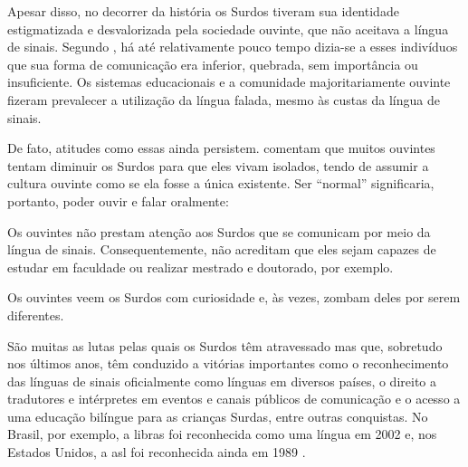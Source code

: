 

Apesar disso, no decorrer da história os Surdos tiveram sua identidade estigmatizada e desvalorizada pela sociedade ouvinte, que não aceitava a língua de sinais. Segundo , há até relativamente pouco tempo dizia-se a esses indivíduos que sua forma de comunicação era inferior, quebrada, sem importância ou insuficiente. Os sistemas educacionais e a comunidade majoritariamente ouvinte fizeram prevalecer a utilização da língua falada, mesmo às custas da língua de sinais.

De fato, atitudes como essas ainda persistem.  comentam que muitos ouvintes tentam  diminuir os Surdos para que eles vivam isolados, tendo de assumir a cultura ouvinte como se ela fosse a única existente. Ser ``normal'' significaria, portanto, poder ouvir e falar oralmente:


\begin{citacao}
    Os ouvintes não prestam atenção aos Surdos que se comunicam por meio da língua de sinais. Consequentemente, não acreditam que eles sejam capazes de estudar em faculdade ou realizar mestrado e  doutorado, por exemplo. \cite{pereira-2011-conhecimento-alem-sinais}
\end{citacao}

\begin{citacao}
    Os ouvintes veem os Surdos com curiosidade e, às vezes, zombam deles por serem diferentes. \cite{strobel-2016-cultura-surda}
\end{citacao}


São muitas as lutas pelas quais os Surdos têm atravessado mas que, sobretudo nos últimos anos, têm conduzido a vitórias importantes como o reconhecimento das línguas de sinais oficialmente como línguas em diversos países, o direito a tradutores e intérpretes em eventos e canais públicos de comunicação e o acesso a uma educação bilíngue para as crianças Surdas, entre outras conquistas. No Brasil, por exemplo, a \acrfull{libras} foi reconhecida como uma língua em 2002 e, nos Estados Unidos, a \acrfull{asl} foi reconhecida ainda em 1989 \cite{brasil-2002-lei10436,pereira-2011-conhecimento-alem-sinais, jay-2011-dont-just-sign}.

